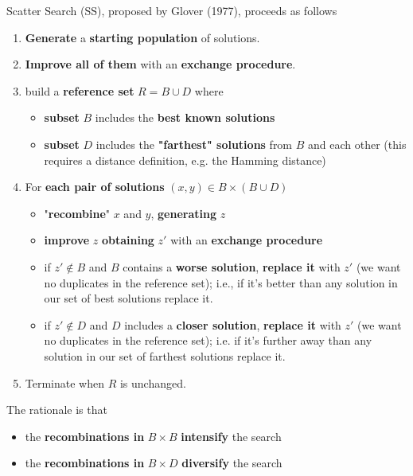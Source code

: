 Scatter Search (SS), proposed by Glover (1977), proceeds as follows
\begin{enumerate}
	\item \textbf{Generate} a \textbf{starting population} of solutions.\\
	
	\item \textbf{Improve all of them} with an \textbf{exchange procedure}.\\
	
	\item build a \textbf{reference set} $R = B \cup D$ where
	\begin{itemize}
		\item \textbf{subset} $B$ includes the \textbf{best known solutions}
		\item \textbf{subset} $D$ includes the \textbf{"farthest" solutions} from $B$ and each other (this requires a distance definition, e.g. the Hamming distance)
	\end{itemize}
	\nn
	
	\item For \textbf{each pair of solutions} $(x, y ) \in B \times (B \cup D)$
	\begin{itemize}
		\item "\textbf{recombine}" $x$ and $y$, \textbf{generating} $z$
		
		\item \textbf{improve} $z$ \textbf{obtaining} $z'$ with an \textbf{exchange procedure}
		
		\item if $z' \notin B$ and $B$ contains a \textbf{worse solution}, \textbf{replace it} with $z'$ (we want no duplicates in the reference set); i.e., if it's better than any solution in our set of best solutions replace it.
		
		\item if $z' \notin D$ and $D$ includes a \textbf{closer solution}, \textbf{replace it} with $z'$ (we want no duplicates in the reference set); i.e. if it's further away than any solution in our set of farthest solutions replace it.
	\end{itemize}
	\nn
	
	\item Terminate when $R$ is unchanged.\\
\end{enumerate}

The rationale is that
\begin{itemize}
	\item the \textbf{recombinations in} $B \times B$ \textbf{intensify} the search
	
	\item the \textbf{recombinations in} $B \times D$ \textbf{diversify} the search
\end{itemize}

